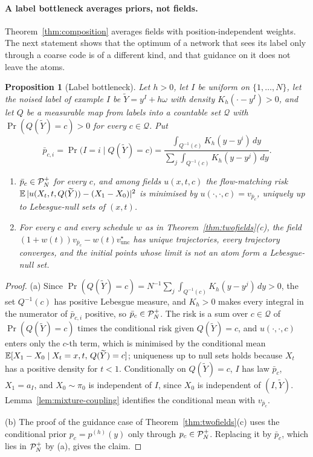 \documentclass{article} %
\theoremstyle{plain}
\newtheorem{proposition}[theorem]{Proposition}
\theoremstyle{definition}
\theoremstyle{remark}
\begin{document}
\paragraph{A label bottleneck averages priors, not fields.} Theorem~\ref{thm:composition} averages
fields with position-independent weights. The next statement shows that the optimum of a network
that sees its label only through a coarse code is of a different kind, and that guidance on it
does not leave the atoms.

\begin{proposition}[Label bottleneck]
\label{prop:bottleneck}
Let $h>0$, let $I$ be uniform on $\{1,\dots,N\}$, let the noised label of example $I$ be $\widetilde Y=y^I+h\omega$ with density $K_h(\cdot-y^I)>0$, and let $Q$ be a measurable map
from labels into a countable set $\mathcal Q$ with $\Pr(Q(\widetilde Y)=c)>0$ for every
$c\in\mathcal Q$. Put
\[
\bar p_{c,i}=\Pr\bigl(I=i\mid Q(\widetilde Y)=c\bigr)
=\frac{\int_{Q^{-1}(c)}K_h(y-y^i)\,dy}{\sum_j\int_{Q^{-1}(c)}K_h(y-y^j)\,dy}.
\]
\begin{enumerate}[label=(\alph*),leftmargin=2em]
\item $\bar p_c\in\mathcal{P}_N^{+}$ for every $c$, and among fields $u(x,t,c)$ the flow-matching risk
  $\mathbb{E}\,|u(X_t,t,Q(\widetilde Y))-(X_1-X_0)|^2$ is minimised by $u(\cdot,\cdot,c)=v_{\bar p_c}$,
  uniquely up to Lebesgue-null sets of $(x,t)$.
\item For every $c$ and every schedule $w$ as in Theorem~\ref{thm:twofields}(c), the field
  $(1+w(t))v_{\bar p_c}-w(t)v_{\mathrm{unc}}^\star$ has unique trajectories, every trajectory
  converges, and the initial points whose limit is not an atom form a Lebesgue-null set.
\end{enumerate}
\end{proposition}
\begin{proof}
(a) Since $\Pr(Q(\widetilde Y)=c)=N^{-1}\sum_j\int_{Q^{-1}(c)}K_h(y-y^j)\,dy>0$, the set
$Q^{-1}(c)$ has positive Lebesgue measure, and $K_h>0$ makes every integral in the numerator of
$\bar p_{c,i}$ positive, so $\bar p_c\in\mathcal{P}_N^{+}$. The risk is a sum over
$c\in\mathcal Q$ of $\Pr(Q(\widetilde Y)=c)$ times the conditional risk given
$Q(\widetilde Y)=c$, and $u(\cdot,\cdot,c)$ enters only the $c$-th term, which is minimised by
the conditional mean $\mathbb{E}[X_1-X_0\mid X_t=x,t,\,Q(\widetilde Y)=c]$; uniqueness up to null sets
holds because $X_t$ has a positive density for $t<1$. Conditionally on $Q(\widetilde Y)=c$, $I$ has
law $\bar p_c$, $X_1=a_I$, and $X_0\sim\pi_0$ is independent of $I$, since $X_0$ is independent of
$(I,\widetilde Y)$. Lemma~\ref{lem:mixture-coupling} identifies the conditional mean with
$v_{\bar p_c}$.

(b) The proof of the guidance case of Theorem~\ref{thm:twofields}(c) uses the conditional prior $p_c=p^{(h)}(y)$ only
through $p_c\in\mathcal{P}_N^{+}$. Replacing it by $\bar p_c$, which lies in $\mathcal{P}_N^{+}$ by (a), gives the claim.
\end{proof}
\end{document}
